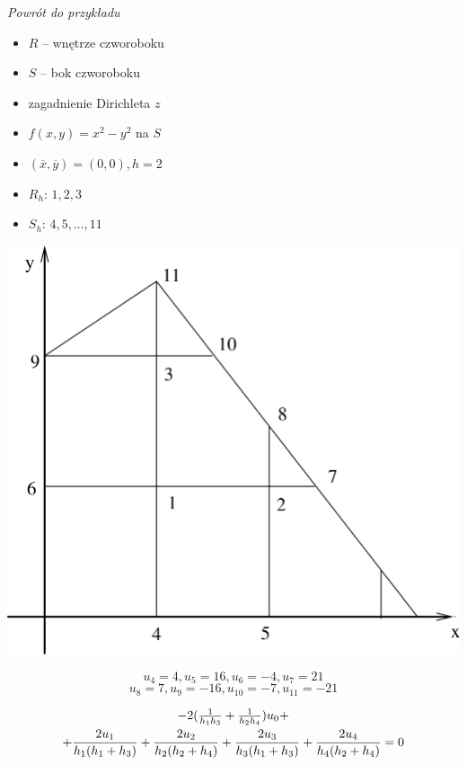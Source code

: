 \begin{frame}
  \textit{Powrót do przykładu}

  \begin{itemize}
    \item $R$ -- wnętrze czworoboku
    \item $S$ -- bok czworoboku
    \item zagadnienie Dirichleta $z$
    \item $f(x,y) = x^2 - y^2$ na $S$
    \item $(\overline{x}, \overline{y}) = (0,0), h=2$
    \item $R_h$: $1,2,3$
    \item $S_h$: $4,5, \dots , 11$
  \end{itemize}
\end{frame}

\begin{frame}
  \centerline{\includegraphics[height = 0.85 \textheight]{img/23/przyklad2}}
\end{frame}

\begin{frame}
  $$ u_4 = 4, u_5 = 16, u_6 = -4, u_7 = 21 $$
  $$ u_8 = 7, u_9 = -16, u_{10} = -7, u_{11} = -21 $$

  \begin{multline*}
    $$ -2 (\frac{1}{h_1 h_3} + \frac{1}{h_2 h_4}) u_0 + \\
    + \frac{2 u_1}{h_1 (h_1 + h_3)} + \frac{2 u_2}{h_2 (h_2 + h_4)} + \frac{2 u_3}{h_3 (h_1 + h_3)} + \frac{2 u_4}{h_4 (h_2 + h_4)} = 0 $$
  \end{multline*}
\end{frame}

